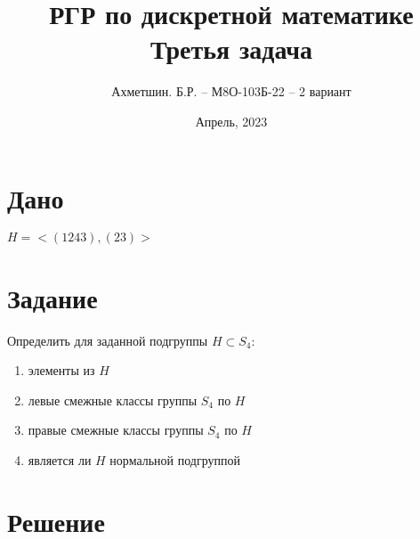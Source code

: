 \documentclass{article}
\title{РГР по дискретной математике\\Третья задача}
\author{Ахметшин. Б.Р. -- М8О-103Б-22 -- 2 вариант}
\date{Апрель, 2023}
\begin{document}
\maketitle


\section*{Дано}
$H = <(1243), (23)>$


\section*{Задание}
Определить для заданной подгруппы $H \subset S_4$:
\begin{enumerate}
    \item элементы из $H$
    \item левые смежные классы группы $S_4$ по $H$
    \item правые смежные классы группы $S_4$ по $H$
    \item является ли $H$ нормальной подгруппой
\end{enumerate}


\section*{Решение}
\end{document}

